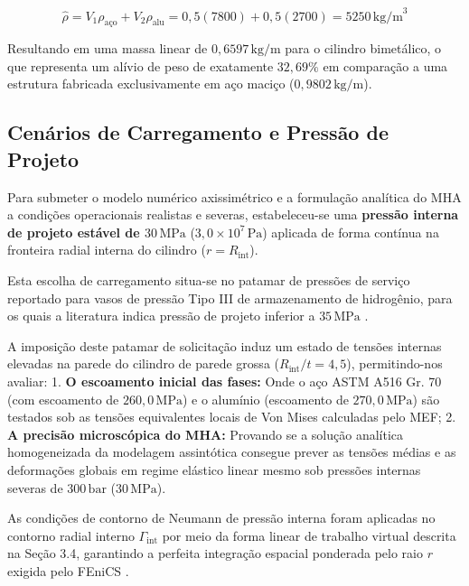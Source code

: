 \begin{equation}
  \hat{\rho} = V_1 \rho_{\text{aço}} + V_2 \rho_{\text{alu}} = 0,5 (7800) + 0,5 (2700) = 5250 \, \text{kg/m}^3
  \label{eq:densidade_efetiva}
\end{equation}


Resultando em uma massa linear de $0,6597 \, \text{kg/m}$ para o cilindro bimetálico, o que representa um alívio de peso de exatamente $32,69\%$ em comparação a uma estrutura fabricada exclusivamente em aço maciço ($0,9802 \, \text{kg/m}$).%


\subsection{Cenários de Carregamento e Pressão de Projeto}

Para submeter o modelo numérico axissimétrico e a formulação analítica do MHA a condições operacionais realistas e severas, estabeleceu-se uma \textbf{pressão interna de projeto estável de $30 \, \text{MPa}$} ($3,0 \times 10^7 \, \text{Pa}$) aplicada de forma contínua na fronteira radial interna do cilindro ($r = R_{\text{int}}$).

Esta escolha de carregamento situa-se no patamar de pressões de serviço reportado para vasos de pressão Tipo III de armazenamento de hidrogênio, para os quais a literatura indica pressão de projeto inferior a $35 \, \text{MPa}$ \cite{Zhang2022}.

A imposição deste patamar de solicitação induz um estado de tensões internas elevadas na parede do cilindro de parede grossa ($R_{\text{int}}/t = 4,5$), permitindo-nos avaliar:
1. \textbf{O escoamento inicial das fases:} Onde o aço ASTM A516 Gr. 70 (com escoamento de $260,0 \, \text{MPa}$) e o alumínio (escoamento de $270,0 \, \text{MPa}$) são testados sob as tensões equivalentes locais de Von Mises calculadas pelo MEF;
2. \textbf{A precisão microscópica do MHA:} Provando se a solução analítica homogeneizada da modelagem assintótica consegue prever as tensões médias e as deformações globais em regime elástico linear mesmo sob pressões internas severas de $300 \, \text{bar}$ ($30 \, \text{MPa}$).

As condições de contorno de Neumann de pressão interna foram aplicadas no contorno radial interno $\Gamma_{\text{int}}$ por meio da forma linear de trabalho virtual descrita na Seção 3.4, garantindo a perfeita integração espacial ponderada pelo raio $r$ exigida pelo FEniCS \cite{logg2012automated}.

